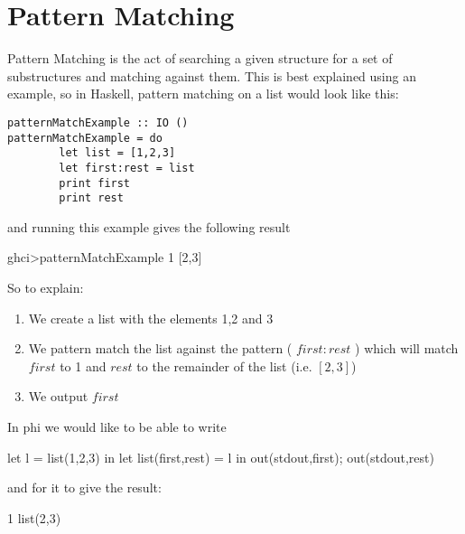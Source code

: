 \section{Pattern Matching}
\label{sec:patterns}
Pattern Matching is the act of searching a given structure for a set of substructures and matching against them. This is best explained using an example, so in Haskell, pattern matching on a list would look like this:

\label{example:pmatchhask}
\begin{verbatim}
patternMatchExample :: IO ()
patternMatchExample = do
        let list = [1,2,3]
        let first:rest = list
        print first
        print rest
\end{verbatim}
and running this example gives the following result
\begin{code}
    ghci>patternMatchExample 
    1
    [2,3]
\end{code}

So to explain:
\begin{enumerate}
    \item We create a list with the elements 1,2 and 3
    \item We pattern match the list against the pattern ( $first:rest$ ) which will match $first$ to 1 and $rest$ to the remainder of the list (i.e. $[2,3]$)
    \item We output $first$
\end{enumerate}

In phi we would like to be able to write

\begin{code}
let l = list(1,2,3) in
    let list(first,rest) = l in
        out(stdout,first);
        out(stdout,rest)
\end{code}

and for it to give the result:

\begin{code}
    1
    list(2,3)
\end{code}

